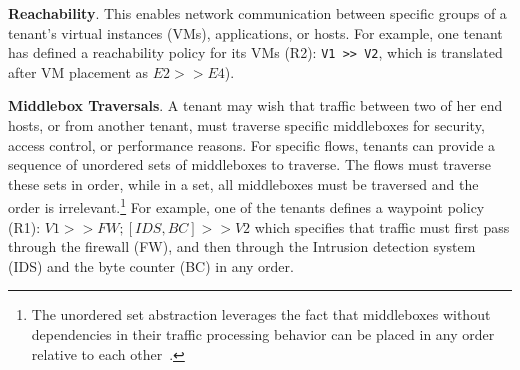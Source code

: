 


\begin{compactitemize}
\item \textbf{Reachability}. This enables network communication
  between specific groups of a tenant's virtual instances (VMs),
  applications, or hosts. For example, one tenant has defined a
  reachability policy for its VMs (R2): \texttt{V1 >> V2}, which is translated
  after VM placement as $E2 >> E4$).
\item \textbf{Middlebox Traversals}. A tenant may wish that traffic
  between two of her end hosts, or from another tenant, must traverse
  specific middleboxes for %
  security, access control, or performance reasons. For specific
  flows, tenants can provide a sequence of unordered sets of
  middleboxes
  to traverse. The flows must traverse these sets in order, while in a
  set, all middleboxes must be traversed and the order is
  irrelevant.\footnote{The unordered set abstraction leverages the
    fact that middleboxes without dependencies in their traffic
    processing behavior can be placed in any order relative to each
    other~\cite{pga}.} For example, one of the tenants 
   defines a waypoint policy (R1): $V1 >> FW;
       [IDS,BC] >> V2$ which specifies that traffic must first pass
       through the firewall (FW), and then through 
       the Intrusion detection system (IDS) and the
       byte counter (BC) in any order.



\end{compactitemize}
